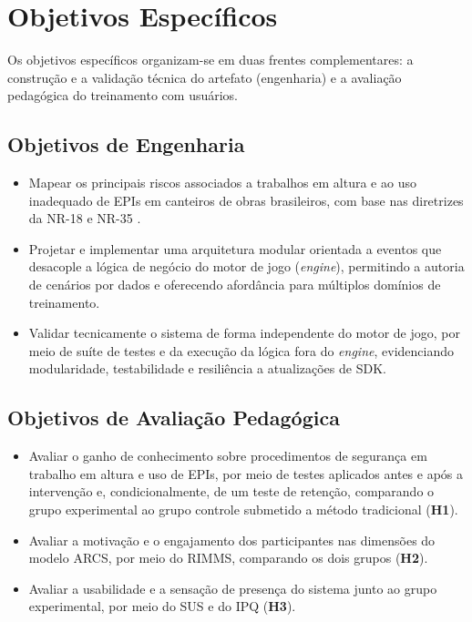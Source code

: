 \chapter{Objetivos Específicos}
\label{cap:objetivos}

Os objetivos específicos organizam-se em duas frentes complementares: a construção e a validação técnica do artefato (engenharia) e a avaliação pedagógica do treinamento com usuários.

\section{Objetivos de Engenharia}

\begin{itemize}
    \item Mapear os principais riscos associados a trabalhos em altura e ao uso inadequado de EPIs em canteiros de obras brasileiros, com base nas diretrizes da NR-18 \cite{brasil2025nr18} e NR-35 \cite{brasil2023nr35}.
    \item Projetar e implementar uma arquitetura modular orientada a eventos que desacople a lógica de negócio do motor de jogo (\textit{engine}), permitindo a autoria de cenários por dados e oferecendo afordância para múltiplos domínios de treinamento.
    \item Validar tecnicamente o sistema de forma independente do motor de jogo, por meio de suíte de testes e da execução da lógica fora do \textit{engine}, evidenciando modularidade, testabilidade e resiliência a atualizações de \gls{SDK}.
\end{itemize}

\section{Objetivos de Avaliação Pedagógica}

\begin{itemize}
    \item Avaliar o ganho de conhecimento sobre procedimentos de segurança em trabalho em altura e uso de EPIs, por meio de testes aplicados antes e após a intervenção e, condicionalmente, de um teste de retenção, comparando o grupo experimental ao grupo controle submetido a método tradicional (\textbf{H1}).
    \item Avaliar a motivação e o engajamento dos participantes nas dimensões do modelo ARCS, por meio do RIMMS, comparando os dois grupos (\textbf{H2}).
    \item Avaliar a usabilidade e a sensação de presença do sistema junto ao grupo experimental, por meio do \gls{SUS} e do \gls{IPQ} (\textbf{H3}).
\end{itemize}
